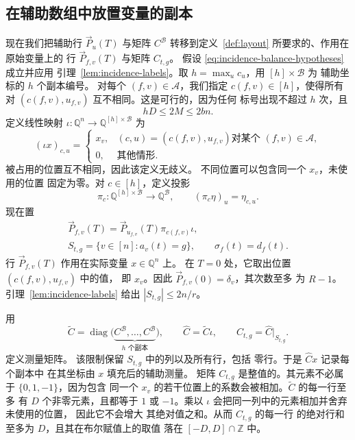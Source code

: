 \documentclass[11pt,reqno]{amsart}
\numberwithin{equation}{section}
\theoremstyle{definition}\newtheorem{definition}[theorem]{定义}
\theoremstyle{remark}\newtheorem{remark}[theorem]{注}
\renewcommand{\le}{\leqslant}
\begin{document}
\subsection{在辅助数组中放置变量的副本}\label{subsec:embedding}
现在我们把辅助行 $\vec{P}_u(T)$ 与矩阵
$C^{\mathcal B}$ 转移到定义~\ref{def:layout} 所要求的、作用在原始变量上的
行 $\vec{P}_{f,v}(T)$ 与矩阵 $C_{t,g}$。
假设 \eqref{eq:incidence-balance-hypotheses} 成立并应用
引理~\ref{lem:incidence-labels}。取 $h=\max_u c_u$，用 $[h]\times\mathcal B$ 为
辅助坐标的 $h$ 个副本编号。
对每个 $(f,v)\in\mathcal A$，我们指定 $c(f,v)\in[h]$，使得所有
对 $(c(f,v),u_{f,v})$ 互不相同。这是可行的，因为任何
标号出现不超过 $h$ 次，且
\[
 hD\le2M\le2bn.
\]
定义线性映射
$\iota:\mathbb Q^n\longrightarrow\mathbb Q^{[h]\times\mathcal B}$ 为
\[
 (\iota x)_{c,u}=
 \begin{cases}
 x_v,&(c,u)=(c(f,v),u_{f,v})\text{对某个 }(f,v)\in\mathcal A,\\
 0,&\text{其他情形}.
 \end{cases}
\]
被占用的位置互不相同，因此该定义无歧义。
不同位置可以包含同一个 $x_v$，未使用的位置
固定为零。对 $c\in[h]$，定义投影
\[
 \pi_c:\mathbb Q^{[h]\times\mathcal B}\longrightarrow\mathbb Q^{\mathcal B},
 \qquad (\pi_c\eta)_u=\eta_{c,u}.
\]
现在置
\begin{equation}\label{eq:actual-rows}
 \begin{gathered}
 \vec{P}_{f,v}(T)=\vec{P}_{u_{f,v}}(T)\pi_{c(f,v)}\iota,\\
 S_{t,g}=\{v\in[n]:a_v(t)=g\},\qquad \sigma_f(t)=d_f(t).
 \end{gathered}
\end{equation}
行 $\vec{P}_{f,v}(T)$ 作用在实际变量 $x\in\mathbb Q^n$ 上。
在 $T=0$ 处，它取出位置 $(c(f,v),u_{f,v})$ 中的值，
即 $x_v$。因此 $\vec{P}_{f,v}(0)=\delta_v$，其次数至多
为 $R-1$。引理~\ref{lem:incidence-labels} 给出 $|S_{t,g}|\le2n/r$。

用
\begin{equation}\label{eq:actual-measurements}
 \widetilde C=\operatorname{diag}
   \bigl(\underbrace{C^{\mathcal B},\ldots,C^{\mathcal B}}_{h\text{ 个副本}}\bigr),
 \qquad \widehat C=\widetilde C\iota,
 \qquad C_{t,g}=\widehat C|_{S_{t,g}}.
\end{equation}
定义测量矩阵。
该限制保留 $S_{t,g}$ 中的列以及所有行，包括
零行。于是 $\widehat Cx$ 记录每个副本中
在其坐标由 $x$ 填充后的辅助测量。
矩阵 $C_{t,g}$ 是整值的。其元素不必属于
$\{0,1,-1\}$，因为包含
同一个 $x_v$ 的若干位置上的系数会被相加。$\widetilde C$ 的每一行至多
有 $D$ 个非零元素，且都等于 $1$ 或 $-1$。乘以
$\iota$ 会把同一列中的元素相加并舍弃未使用的位置，
因此它不会增大
其绝对值之和。从而 $C_{t,g}$ 的每一行
的绝对行和至多为 $D$，且其在布尔赋值上的取值
落在 $[-D,D]\cap\mathbb Z$ 中。
\end{document}
